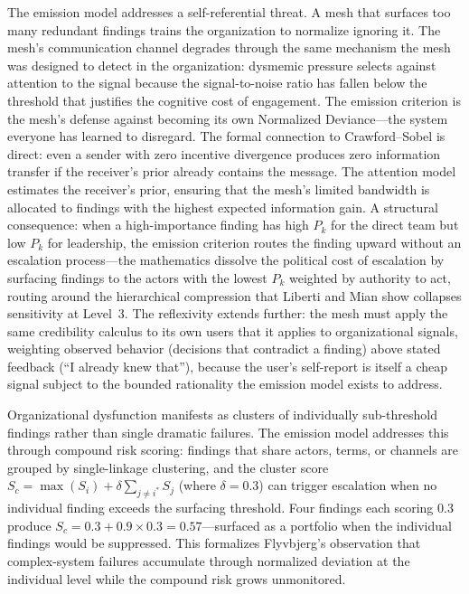 \documentclass[11pt,a4paper]{article}
\begin{document}
The emission model addresses a self-referential threat. A mesh that surfaces too many redundant findings trains the organization to normalize ignoring it. The mesh's communication channel degrades through the same mechanism the mesh was designed to detect in the organization: dysmemic pressure selects against attention to the signal because the signal-to-noise ratio has fallen below the threshold that justifies the cognitive cost of engagement. The emission criterion is the mesh's defense against becoming its own Normalized Deviance---the system everyone has learned to disregard. The formal connection to Crawford--Sobel is direct: even a sender with zero incentive divergence produces zero information transfer if the receiver's prior already contains the message. The attention model estimates the receiver's prior, ensuring that the mesh's limited bandwidth is allocated to findings with the highest expected information gain. A structural consequence: when a high-importance finding has high $P_k$ for the direct team but low $P_k$ for leadership, the emission criterion routes the finding upward without an escalation process---the mathematics dissolve the political cost of escalation by surfacing findings to the actors with the lowest $P_k$ weighted by authority to act, routing around the hierarchical compression that Liberti and Mian show collapses sensitivity at Level~3. The reflexivity extends further: the mesh must apply the same credibility calculus to its own users that it applies to organizational signals, weighting observed behavior (decisions that contradict a finding) above stated feedback (``I already knew that''), because the user's self-report is itself a cheap signal subject to the bounded rationality the emission model exists to address.

Organizational dysfunction manifests as clusters of individually sub-threshold findings rather than single dramatic failures. The emission model addresses this through compound risk scoring: findings that share actors, terms, or channels are grouped by single-linkage clustering, and the cluster score $S_c = \max(S_i) + \delta \sum_{j \neq i^*} S_j$ (where $\delta = 0.3$) can trigger escalation when no individual finding exceeds the surfacing threshold. Four findings each scoring 0.3 produce $S_c = 0.3 + 0.9 \times 0.3 = 0.57$---surfaced as a portfolio when the individual findings would be suppressed. This formalizes Flyvbjerg's observation that complex-system failures accumulate through normalized deviation at the individual level while the compound risk grows unmonitored.
\end{document}
